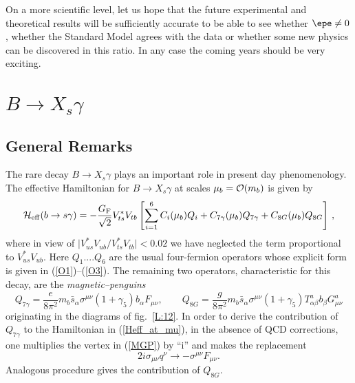 On a more scientific level,
let us hope that the future experimental and theoretical results will
be sufficiently accurate to be able to see whether $\epe\not=0$,
whether the Standard Model agrees with the data or
whether some new physics can be discovered in this ratio. In any case the
coming years should be very exciting. 

\section{$B\to X_s\gamma$} 
\setcounter{equation}{0}
\subsection{General Remarks}
The rare decay $B\to X_s\gamma$ plays an important role in 
present day phenomenology. 
The effective Hamiltonian for $B\to X_s\gamma$ at scales 
$\mu_b={\cal O}(m_b)$
is given by
\begin{equation} \label{Heff_at_mu}
{\cal H}_{\rm eff}(b\to s\gamma) = - \frac{G_{\rm F}}{\sqrt{2}} V_{ts}^* V_{tb}
\left[ \sum_{i=1}^6 C_i(\mu_b) Q_i + C_{7\gamma}(\mu_b) Q_{7\gamma}
+C_{8G}(\mu_b) Q_{8G} \right]\,,
\end{equation}
where in view of $\mid V_{us}^*V_{ub} / V_{ts}^* V_{tb}\mid < 0.02$
we have neglected the term proportional to $V_{us}^* V_{ub}$.
Here $Q_1....Q_6$ are the usual four-fermion operators whose
explicit form is given in (\ref{O1})--(\ref{O3}). 
The remaining two operators,
characteristic for this decay, are the {\it magnetic--penguins}
\begin{equation}\label{O6B}
Q_{7\gamma}  =  \frac{e}{8\pi^2} m_b \bar{s}_\alpha \sigma^{\mu\nu}
          (1+\gamma_5) b_\alpha F_{\mu\nu},\qquad            
Q_{8G}     =  \frac{g}{8\pi^2} m_b \bar{s}_\alpha \sigma^{\mu\nu}
   (1+\gamma_5)T^a_{\alpha\beta} b_\beta G^a_{\mu\nu}  
\end{equation}
originating in the diagrams of fig.~\ref{L:12}.
In order to derive the contribution of $Q_{7\gamma}$ to the
Hamiltonian in (\ref{Heff_at_mu}), in the absence of QCD corrections,
one multiplies the vertex in (\ref{MGP})
by ``i'' and makes the replacement 
\begin{equation}
2i\sigma_{\mu\nu}q^\nu\to-\sigma^{\mu\nu}F_{\mu\nu}.
\end{equation}
Analogous
procedure gives the contribution of $Q_{8G}$.

